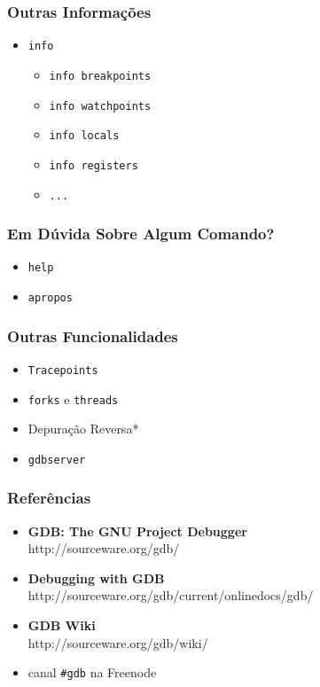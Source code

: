 \documentclass[xcolor=pdftex,dvipsnames,table,t]{beamer}
\begin{document}
\begin{frame}[fragile]
	\frametitle{Outras Informações}
	  \begin{itemize}
	    \item{\verb|info|}
	    \begin{itemize}
	      \item{\verb|info breakpoints|}
	      \item{\verb|info watchpoints|}
	      \item{\verb|info locals|}
	      \item{\verb|info registers|}
	      \item{\verb|...|}
	    \end{itemize}
	  \end{itemize}
\end{frame}

\begin{frame}[fragile]
	\frametitle{Em Dúvida Sobre Algum Comando?}
	  \begin{itemize}
	    \item{\verb|help|}
	    \item{\verb|apropos|}
	  \end{itemize}
\end{frame}

\begin{frame}[fragile]
	\frametitle{Outras Funcionalidades}
	  \begin{itemize}
	    \item{\verb|Tracepoints|}
	    \item{\verb|forks| e \verb|threads|}
	    \item{Depuração Reversa*}
	    \item{\verb|gdbserver|}
	  \end{itemize}
\end{frame}

\begin{frame}
       \frametitle{Referências}
        \begin{center}
        \begin{itemize}
		\item \textbf{GDB: The GNU Project Debugger} \\
		http://sourceware.org/gdb/
		\item \textbf{Debugging with GDB} \\
		http://sourceware.org/gdb/current/onlinedocs/gdb/
		\item \textbf{GDB Wiki} \\
		http://sourceware.org/gdb/wiki/
		\item canal \texttt{\#gdb} na Freenode
	\end{itemize}
        \end{center}
\end{frame}
\end{document}
